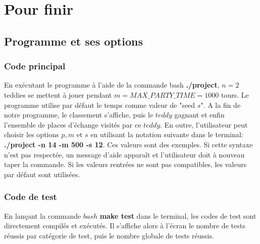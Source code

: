 \documentclass{article}
\begin{document}
\section{Pour finir }

\subsection{Programme et ses options}

\subsubsection{Code principal}
En exécutant le programme à l'aide de la commande bash \textbf{./project}, $n=2$ teddies se mettent à jouer pendant $m = MAX\_PARTY\_TIME=1000$ tours. Le programme utilise par défaut le temps comme valeur de "seed $s$". A la fin de notre programme, le classement s'affiche, puis le $teddy$ gagnant et enfin l'ensemble de places d'échange visités par ce $teddy$. En outre, l'utilisateur peut choisir les options $p, m $ et $s$ en utilisant la notation suivante dans le terminal: \textbf{./project -n 14 -m 500 -s 12}. Ces valeurs sont des exemples. Si cette syntaxe n'est pas respectée, un message d'aide apparaît et l'utilisateur doit à nouveau taper la commande. Si les valeurs rentrées ne sont pas compatibles, les valeurs par défaut sont utilisées. 

\subsubsection{Code de test}
En lançant la commande $bash$ \textbf{make test} dans le terminal, les codes de test sont directement compilés et exécutés. Il s'affiche alors à l'écran le nombre de tests réussis par catégorie de test, puis le nombre globale de tests réussis. 
\end{document}
